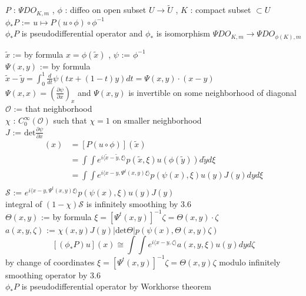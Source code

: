\documentclass[dvipdfmx]{jsarticle}
\begin{document}
\begin{Theorem}
\itemwhen
  \For \(P\) : \(\Psi DO_{K,m}\) , \(\phi\) : diffeo on open subset \(U \to \tilde{U}\) , \(K\) : compact subset \(\subset U\) \\
  \Define \(\phi_* P\) := \(u \mapsto P(u \circ \phi) \circ \phi^{-1}\) \\
  \Then \(\phi_* P\) is pseudodifferential operator and \(\phi_*\) is isomorphism \(\Psi DO_{K,m} \to \Psi DO_{\phi(K),m}\)
\end{Theorem}

\begin{Proof}
\itemprop
  \Define \(\tilde{x}\) := by formula \(x = \phi(\tilde{x})\) , \(\psi\) := \(\phi^{-1}\) \\
  \Define \(\Psi(x,y)\) := by formula \(\tilde{x} - \tilde{y} = \int_0^1 \frac{d}{dt} \psi (tx + (1-t)y) dt = \Psi(x,y) \cdot (x-y)\) \\
  \Then \(\Psi(x,x) = (\frac{\partial \psi}{\partial x})_x\) and \(\Psi(x,y)\) is invertible on some neighborhood of diagonal \\
  \Define \(\mathscr{O}\) := that neighborhood \\
  \Take \(\chi\) : \(C^\infty_0(\mathscr{O})\) such that \(\chi = 1\) on smaller neighborhood \\
  \Define \(J\) := \(\text{det} \frac{\partial \psi}{\partial x}\) \\
  \Then
  \begin{align*}
    [(\phi_* P)u](x) &= [P(u \circ \phi)] (\tilde{x}) \\
    &= \int \int e^{i \langle \tilde{x} - \tilde{y} , \xi \rangle} p(\tilde{x} , \xi) u(\phi(\tilde{y})) d\tilde{y} d\xi \\
    &= \int \int e^{i \langle x - y , \Psi^t(x,y) \xi \rangle} p(\psi(x) , \xi) u(y) J(y) dy d\xi \\
  \end{align*}
  \Define \(\mathscr{S}\) := \(e^{i \langle x - y , \Psi^t(x,y) \xi \rangle} p(\psi(x) , \xi) u(y) J(y)\) \\
  \Then integral of \((1 - \chi) \mathscr{S}\) is infinitely smoothing by 3.6 \\
  \Define \(\Theta(x,y)\) := by formula \(\xi = [\Psi^t(x,y)]^{-1}\zeta = \Theta(x,y) \cdot \zeta\) \\
  \Define \(a(x,y,\zeta)\) := \(\chi(x,y) J(y) \lvert \text{det} \Theta \rvert p(\psi(x) , \Theta(x,y) \zeta)\) \\
  \Then
  \[
    [(\phi_* P)u](x) \cong \int\int e^{i \langle x-y,\zeta \rangle} a(x,y,\xi) u(y) dy d\zeta
  \]
  by change of coordinates \(\xi = [\Psi^t(x,y)]^{-1} \zeta = \Theta(x,y) \zeta\) modulo infinitely smoothing operator by 3.6 \\
  \Then \(\phi_* P\) is pseudodifferential operator by Workhorse theorem
\end{Proof}
\end{document}
